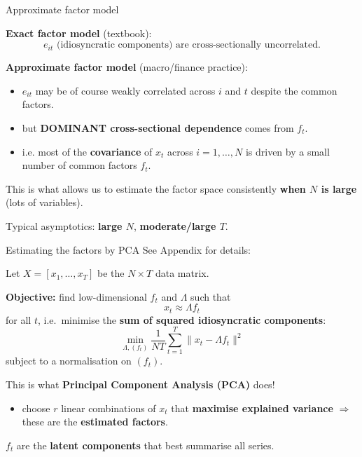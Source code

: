 \documentclass{beamer}
\begin{document}
\begin{frame}{Approximate factor model}
\small

\textbf{Exact factor model} (textbook):
\[
e_{it} \text{ (idiosyncratic components) are cross-sectionally uncorrelated.}
\]

\medskip
\textbf{Approximate factor model} (macro/finance practice):
\begin{itemize}
  \item $e_{it}$ may be of course weakly correlated across $i$ and $t$ despite the common factors.
  \item but \textbf{DOMINANT cross-sectional dependence} comes from $f_t$.
  \item i.e. most of the \textbf{covariance} of $x_t$ across $i=1,\dots,N$ is driven by a small number of common factors $f_t$.
\end{itemize}

\medskip
This is what allows us to estimate the factor space consistently \textbf{when $N$ is large} (lots of variables).

\medskip

Typical asymptotics: \textbf{large $N$}, \textbf{moderate/large $T$}.

\end{frame}


\begin{frame}{Estimating the factors by PCA}
\small
See Appendix for details: 
\hyperlink{pca-algorithm}{}

\medskip
Let $X = [x_1, \dots, x_T]$ be the $N \times T$ data matrix.

\medskip
\textbf{Objective:} find low-dimensional $f_t$ and $\Lambda$ such that
\[
x_t \approx \Lambda f_t
\]
for all $t$, i.e.\ minimise the \textbf{sum of squared idiosyncratic components}:
\[
\min_{\Lambda, (f_t)} \frac{1}{NT} \sum_{t=1}^T \| x_t - \Lambda f_t \|^2
\]
subject to a normalisation on $(f_t)$.

This is what \textbf{Principal Component Analysis (PCA)} does!
\begin{itemize}
  \item choose $r$ linear combinations of $x_t$ that \textbf{maximise explained variance} $\Rightarrow$ these are the \textbf{estimated factors}.
\end{itemize}

\medskip
$f_t$ are the \textbf{latent components} that best summarise all series.

\end{frame}
\end{document}
